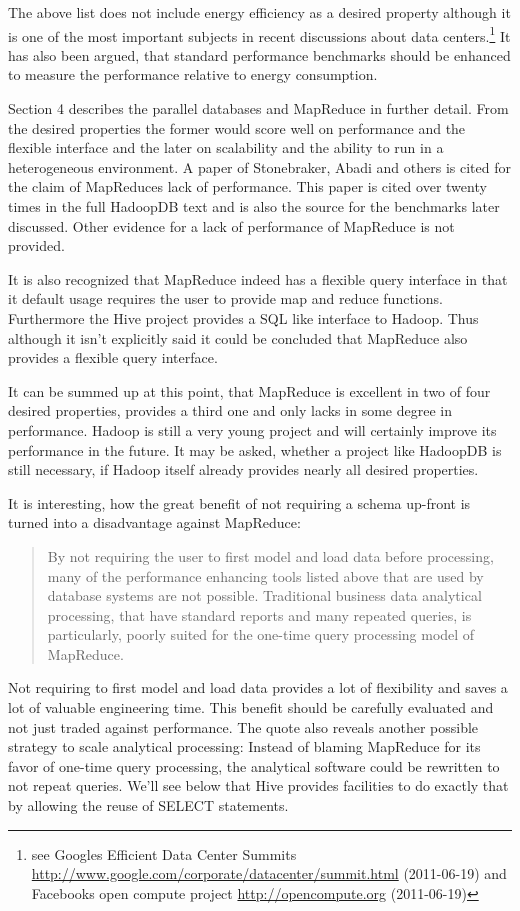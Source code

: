\documentclass[12pt,a4paper]{scrartcl}		%
\newcommand{\citeurl}[2]{\url{#1} (#2)}
\begin{document}
The above list does not include energy efficiency as a desired property although it is one of the most important subjects in recent discussions about data centers.\footnote{see Googles Efficient Data Center Summits \citeurl{http://www.google.com/corporate/datacenter/summit.html}{2011-06-19} and Facebooks open compute project \citeurl{http://opencompute.org}{2011-06-19}} It has also been argued, that standard performance benchmarks should be enhanced to measure the performance relative to energy consumption.\cite{Fanara:2009:SEP:1692899.1692904}

Section 4 describes the parallel databases and MapReduce in further detail. From the desired properties the former would score well on performance and the flexible interface and the later on scalability and the ability to run in a heterogeneous environment. A paper of Stonebraker, Abadi and others\cite{Pavlo09} is cited for the claim of MapReduces lack of performance. This paper is cited over twenty times in the full HadoopDB text and is also the source for the benchmarks later discussed. Other evidence for a lack of performance of MapReduce is not provided.

It is also recognized that MapReduce indeed has a flexible query interface in that it default usage requires the user to provide map and reduce functions. Furthermore the Hive project provides a SQL like interface to Hadoop. Thus although it isn't explicitly said it could be concluded that MapReduce also provides a flexible query interface.

It can be summed up at this point, that MapReduce is excellent in two of four desired properties, provides a third one and only lacks in some degree in performance. Hadoop is still a very young project and will certainly improve its performance in the future. It may be asked, whether a project like HadoopDB is still necessary, if Hadoop itself already provides nearly all desired properties.

It is interesting, how the great benefit of not requiring a schema up-front is turned into a disadvantage against MapReduce:
\begin{quote}
By not requiring the user to first model and
load data before processing, many of the performance enhancing
tools listed above that are used by database systems are not possible.
Traditional business data analytical processing, that have standard
reports and many repeated queries, is particularly, poorly suited for
the one-time query processing model of MapReduce.
\end{quote}
Not requiring to first model and load data provides a lot of flexibility and saves a lot of valuable engineering time. This benefit should be carefully evaluated and not just traded against performance. The quote also reveals another possible strategy to scale analytical processing: Instead of blaming MapReduce for its favor of one-time query processing, the analytical software could be rewritten to not repeat queries. We'll see below that Hive provides facilities to do exactly that by allowing the reuse of SELECT statements.
\end{document}
